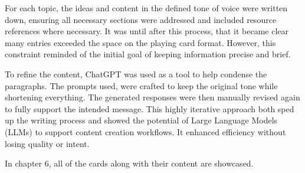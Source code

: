 For each topic, the ideas and content in the defined tone of voice were written down, ensuring all
necessary sections were addressed and included resource references where necessary. It was until
after this process, that it became clear many entries exceeded the space on the playing card format.
However, this constraint reminded of the initial goal of keeping information precise and brief.

To refine the content, ChatGPT was used as a tool to help condense the paragraphs. The prompts used,
were crafted to keep the original tone while shortening everything. The generated responses were
then manually revised again to fully support the intended message. This highly iterative approach
both sped up the writing process and showed the potential of Large Language Models (LLMs) to support
content creation workflows. It enhanced efficiency without losing quality or intent.

In chapter 6, all of the cards along with their content are showcased.
